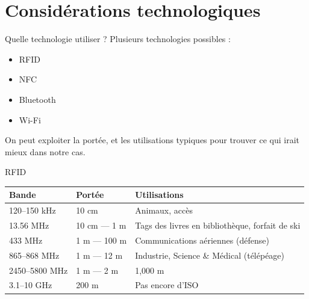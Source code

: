 \documentclass[aspectratio=169]{beamer}
\begin{document}
\section{Considérations technologiques}

\begin{frame}{Quelle technologie utiliser ?}
    Plusieurs technologies possibles :
    \begin{itemize}
        \item RFID
        \item NFC
        \item Bluetooth
        \item Wi-Fi
    \end{itemize}

    \bigskip
    
    On peut exploiter la portée, et les utilisations typiques pour trouver ce qui irait mieux dans notre cas.
\end{frame}

\begin{frame}{RFID}

\begin{table}[]
\begin{tabular}{|l|l|l|}
\hline
\textbf{Bande} & \textbf{Portée} & \textbf{Utilisations}                           \\ \hline
120–150 kHz    & 10 cm           & Animaux, accès                                  \\ \hline
13.56 MHz      & 10 cm — 1 m     & Tags des livres en bibliothèque, forfait de ski \\ \hline
433 MHz        & 1 m — 100 m     & Communications aériennes (défense)              \\ \hline
865–868 MHz    & 1 m — 12 m      & Industrie, Science \& Médical (télépéage)       \\ \hline
2450–5800 MHz  & 1 m — 2 m       & 1,000 m                                         \\ \hline
3.1–10 GHz     & 200 m           & Pas encore d’ISO                                \\ \hline
\end{tabular}
\end{table}

\end{frame}
\end{document}
